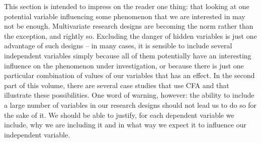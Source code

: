 This section is intended to impress on the reader one thing: that looking at one potential variable influencing some phenomenon that we are interested in may not be enough. Multivariate  research designs  are becoming the norm rather than the exception, and rightly so. Excluding the danger of hidden variables is just one advantage of such designs -- in many cases, it is sensible to include several independent variables simply because all of them potentially have an interesting influence on the phenomenon under investigation, or because there is just one particular combination of values of our variables that has an effect. In the second part of this volume, there are several case studies that use CFA  and that illustrate these possibilities. One word of warning, however: the ability to include a large number of variables in our research designs  should not lead us to do so for the sake of it. We should be able to justify, for each dependent variable we include, why we are including it and in what way we expect it to influence our independent variable.

